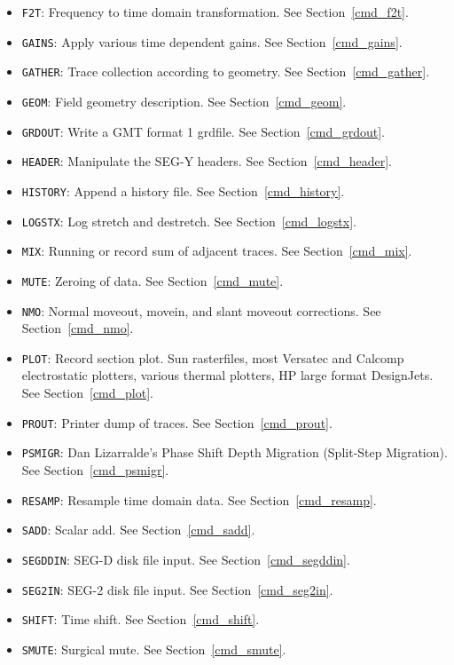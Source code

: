 \begin{itemize}
    \item \texttt{F2T}: Frequency to time domain transformation. See Section~\ref{cmd_f2t}.
    \item \texttt{GAINS}: Apply various time dependent gains. See Section~\ref{cmd_gains}.
    \item \texttt{GATHER}: Trace collection according to geometry. See Section~\ref{cmd_gather}.
    \item \texttt{GEOM}: Field geometry description. See Section~\ref{cmd_geom}.
    \item \texttt{GRDOUT}: Write a GMT format 1 grdfile. See Section~\ref{cmd_grdout}.
    \item \texttt{HEADER}: Manipulate the SEG-Y headers. See Section~\ref{cmd_header}.
    \item \texttt{HISTORY}: Append a history file. See Section~\ref{cmd_history}.
    \item \texttt{LOGSTX}: Log stretch and destretch. See Section~\ref{cmd_logstx}.
    \item \texttt{MIX}: Running or record sum of adjacent traces. See Section~\ref{cmd_mix}.
    \item \texttt{MUTE}: Zeroing of data. See Section~\ref{cmd_mute}.
    \item \texttt{NMO}: Normal moveout, movein, and slant moveout corrections. See Section~\ref{cmd_nmo}.
    \item \texttt{PLOT}: Record section plot. Sun rasterfiles, most Versatec and Calcomp electrostatic plotters, various thermal plotters, HP large format DesignJets. See Section~\ref{cmd_plot}.
    \item \texttt{PROUT}: Printer dump of traces. See Section~\ref{cmd_prout}.
    \item \texttt{PSMIGR}: Dan Lizarralde's Phase Shift Depth Migration (Split-Step Migration). See Section~\ref{cmd_psmigr}.
    \item \texttt{RESAMP}: Resample time domain data. See Section~\ref{cmd_resamp}.
    \item \texttt{SADD}: Scalar add. See Section~\ref{cmd_sadd}.
    \item \texttt{SEGDDIN}: SEG-D disk file input. See Section~\ref{cmd_segddin}.
    \item \texttt{SEG2IN}: SEG-2 disk file input. See Section~\ref{cmd_seg2in}.
    \item \texttt{SHIFT}: Time shift. See Section~\ref{cmd_shift}.
    \item \texttt{SMUTE}: Surgical mute. See Section~\ref{cmd_smute}.

\end{itemize}
